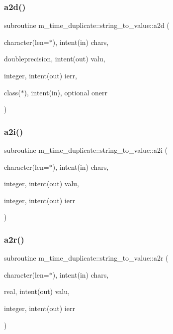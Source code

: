 \subsubsection{\texorpdfstring{a2d()}{a2d()}}
{\footnotesize\ttfamily subroutine m\+\_\+time\+\_\+duplicate\+::string\+\_\+to\+\_\+value\+::a2d (\begin{DoxyParamCaption}\item[{character(len=$\ast$), intent(in)}]{chars,  }\item[{doubleprecision, intent(out)}]{valu,  }\item[{integer, intent(out)}]{ierr,  }\item[{class($\ast$), intent(in), optional}]{onerr }\end{DoxyParamCaption})}

\mbox{\label{interfacem__time__duplicate_1_1string__to__value_ac7694e67b91618807e4334ae33700335}} 
\subsubsection{\texorpdfstring{a2i()}{a2i()}}
{\footnotesize\ttfamily subroutine m\+\_\+time\+\_\+duplicate\+::string\+\_\+to\+\_\+value\+::a2i (\begin{DoxyParamCaption}\item[{character(len=$\ast$), intent(in)}]{chars,  }\item[{integer, intent(out)}]{valu,  }\item[{integer, intent(out)}]{ierr }\end{DoxyParamCaption})}

\mbox{\label{interfacem__time__duplicate_1_1string__to__value_a88d08758f4f106adce30c34597a53fd1}} 
\subsubsection{\texorpdfstring{a2r()}{a2r()}}
{\footnotesize\ttfamily subroutine m\+\_\+time\+\_\+duplicate\+::string\+\_\+to\+\_\+value\+::a2r (\begin{DoxyParamCaption}\item[{character(len=$\ast$), intent(in)}]{chars,  }\item[{real, intent(out)}]{valu,  }\item[{integer, intent(out)}]{ierr }\end{DoxyParamCaption})}



